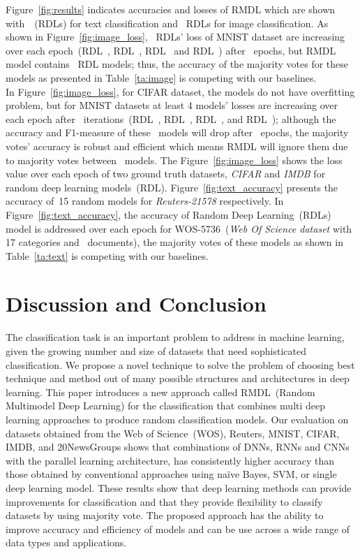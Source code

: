 \documentclass[sigconf, final]{acmart}
\begin{document}
Figure~\ref{fig:results} indicates accuracies and losses of RMDL which are shown with~~(RDLs) for text classification and~ RDLs for image classification. As shown in Figure~\ref{fig:image_loss},~ RDLs' loss of MNIST dataset are increasing over each epoch~(RDL~, RDL~, RDL~ and RDL~) after~ epochs, but RMDL model contains~ RDL models; thus, the accuracy of the majority votes for these models as presented in Table~\ref{ta:image} is competing with our baselines.\\ In Figure~\ref{fig:image_loss}, for CIFAR dataset, the models do not have overfitting problem, but for MNIST datasets at least 4 models' losses are increasing over each epoch after~ iterations~(RDL~, RDL~, RDL~, and RDL~); although the accuracy and F1-measure of these~ models will drop after~ epochs, the majority votes' accuracy is robust and efficient which means RMDL will ignore them due to majority votes between~ models. The Figure~\ref{fig:image_loss} shows the loss value over each epoch of two ground truth datasets, \textit{CIFAR} and \textit{IMDB} for~ random deep learning models~(RDL). Figure~\ref{fig:text_accuracy} presents the accuracy of~15 random models for \textit{Reuters-21578} respectively. In Figure~\ref{fig:text_accuracy}, the accuracy of Random Deep Learning~(RDLs) model is addressed over each epoch for  WOS-5736~(\textit{Web Of Science dataset} with 17 categories and~ documents), the majority votes of these models as shown in Table~\ref{ta:text} is competing with our baselines.

\vspace{-0.1in}
\section{Discussion  and Conclusion}\label{sec:Conclusion}

The classification task is an important problem to address in machine learning, given the growing number and size of datasets that need sophisticated classification.  We propose a novel technique to solve the problem of choosing best technique and method out of many possible structures and architectures in deep learning. This paper introduces a new approach called RMDL~(Random Multimodel Deep Learning) for the classification that combines multi deep learning approaches to produce random classification models. Our evaluation on datasets obtained from the Web of Science~(WOS), Reuters, MNIST, CIFAR, IMDB, and 20NewsGroups shows that combinations of DNNs, RNNs and CNNs with the parallel learning architecture, has consistently higher accuracy than those obtained by conventional approaches using na\"{i}ve Bayes, SVM, or single deep learning model. These results show that deep learning methods can provide improvements for classification and that they provide flexibility to classify datasets by using majority vote. The proposed approach has the ability to improve accuracy and efficiency of models and can be use across a wide range of data types and applications.







 


\end{document}
